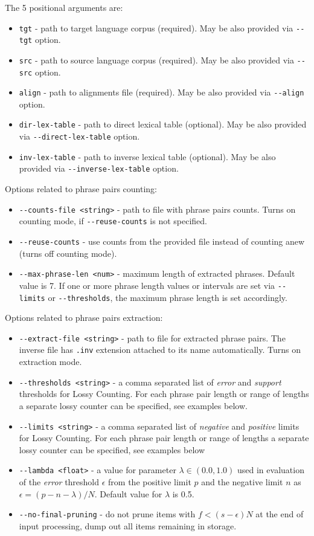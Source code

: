 The 5 positional arguments are:
\begin{itemize}
 \item \verb|tgt| - path to target language corpus (required).
  May be also provided via \verb|--tgt| option.
 \item \verb|src| - path to source language corpus (required).
  May be also provided via \verb|--src| option.
 \item \verb|align| - path to alignments file (required).
  May be also provided via \verb|--align| option.
 \item \verb|dir-lex-table| - path to direct lexical table (optional).
  May be also provided via \verb|--direct-lex-table| option. 
 \item \verb|inv-lex-table| - path to inverse lexical table (optional).
  May be also provided via \verb|--inverse-lex-table| option. 
\end{itemize}

Options related to phrase pairs counting:
\begin{itemize}
 \item \verb|--counts-file <string>| - path to file with phrase pairs counts.
  Turns on counting mode, if \verb|--reuse-counts| is not specified.
 \item \verb|--reuse-counts| - use counts from the provided file instead
  of counting anew (turns off counting mode).
 \item \verb|--max-phrase-len <num>| - maximum length of extracted phrases.
  Default value is 7. If one or more phrase length values or intervals
  are set via \verb|--limits| or \verb|--thresholds|, the maximum phrase
  length is set accordingly.
\end{itemize}

Options related to phrase pairs extraction:
\begin{itemize}
 \item \verb|--extract-file <string>| - path to file for extracted phrase pairs.
  The inverse file has \texttt{.inv} extension attached to its name automatically.
  Turns on extraction mode.
 \item \verb|--thresholds <string>| - a comma separated list of \emph{error} and \emph{support}
  thresholds for Lossy Counting. For each phrase pair length or range of lengths
  a separate lossy counter can be specified, see examples below.
 \item \verb|--limits <string>| - a comma separated list of \emph{negative} and \emph{positive}
  limits for Lossy Counting. For each phrase pair length or range of lengths
  a separate lossy counter can be specified, see examples below
 \item \verb|--lambda <float>| - a value for parameter $\lambda \in (0.0, 1.0)$
  used in evaluation of the \emph{error} threshold $\epsilon$ from
  the positive limit $p$ and the negative limit $n$ as $\epsilon = (p - n - \lambda) / N$.
  Default value for $\lambda$ is 0.5.
 \item \verb|--no-final-pruning| - do not prune items with $f < (s - \epsilon)N$
  at the end of input processing, dump out all items remaining in storage.
\end{itemize}

